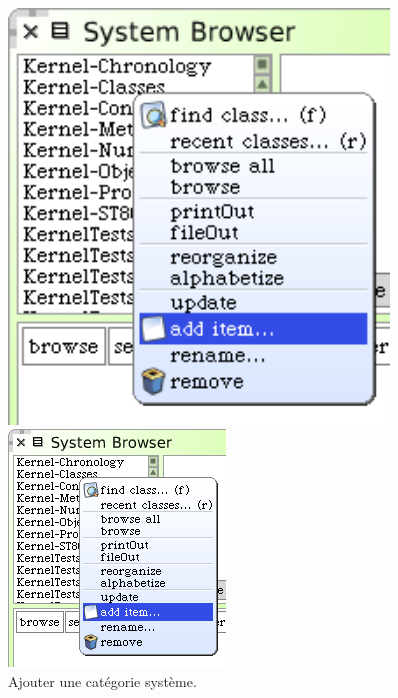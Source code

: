 \documentclass[a4paper,10pt,twoside]{book}
\begin{document}
\begin{figure}[htb]
\begin{minipage}[b]{0.48\textwidth}
\ifluluelse
	{\centerline {\includegraphics[width=0.9\textwidth]{AddCategory}}}
	{\centerline {\includegraphics[scale=0.7]{AddCategory}}}
	\caption{Ajouter une catégorie système.
	\label{fig:addCategory}}
\end{minipage}
\hfill
\begin{minipage}[b]{0.48\textwidth}
\ifluluelse

\end{minipage}
\end{figure}
\end{document}
